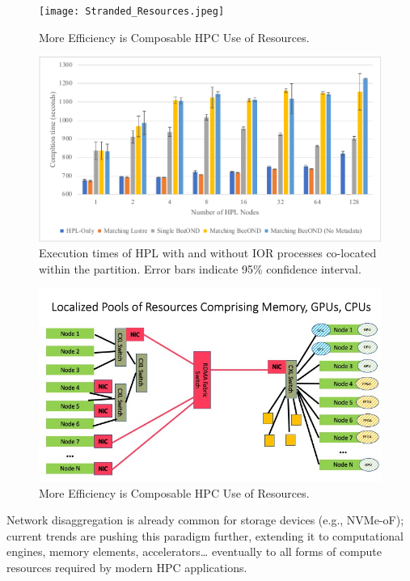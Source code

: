 \begin{figure}[stranded]
\centerline{\texttt{[image: Stranded\_Resources.jpeg]}}
\caption{More Efficiency is Composable HPC Use of Resources.} \label{Fig:stranded}
\end{figure}

\begin{figure}[htbp]
\centerline{\includegraphics{multinode-hpl-runtime-impact}}
\caption{Execution times of HPL with and without IOR processes co-located within the partition. Error bars indicate 95\% confidence interval.}
\label{fig:multinode}
\end{figure}

\begin{figure}[Pools]
\centerline{\includegraphics[width=\columnwidth]{Slide4.jpeg}}
\caption{More Efficiency is Composable HPC Use of Resources.} \label{Fig:Pools}
\end{figure}

Network disaggregation is already common for storage devices (e.g., NVMe-oF); current trends are pushing this paradigm further, extending it to computational engines, memory elements, accelerators… eventually to all forms of compute resources required by modern HPC applications.  

